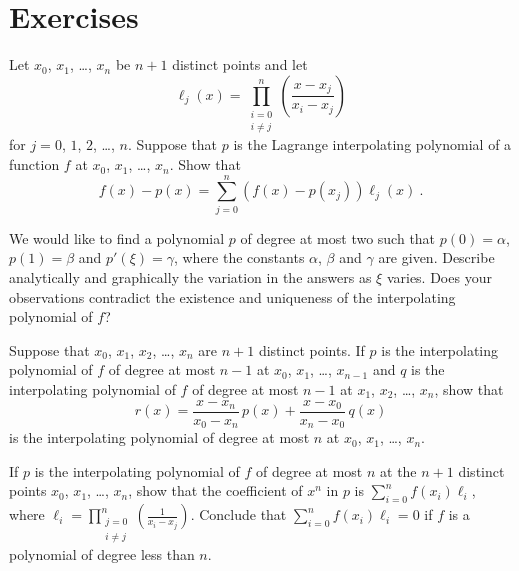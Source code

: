 \section{Exercises}

\begin{question}
Let $x_0$, $x_1$, \ldots, $x_n$ be $n+1$ distinct points and let
\[
\ell_j(x) = \prod_{\substack{i=0\\i\neq j}}^n \left(\frac{x-x_j}{x_i-x_j}\right)
\]
for $j=0$, $1$, $2$, \ldots, $n$.  Suppose that $p$ is the Lagrange
interpolating polynomial of a function $f$ at $x_0$, $x_1$, \ldots,
$x_n$.  Show that
\[
f(x) - p(x) = \sum_{j=0}^n \left(f(x)-p(x_j)\right) \ell_j(x) \ .
\]
\label{intAQ1}
\end{question}

\begin{question}
We would like to find a polynomial $p$ of degree at most two such that
$p(0) = \alpha$, $p(1) = \beta$ and $p'(\xi) = \gamma$, where the
constants $\alpha$, $\beta$ and $\gamma$ are given.  Describe
analytically and graphically the variation in the answers as $\xi$
varies.  Does your observations contradict the existence and uniqueness
of the interpolating polynomial of $f$?
\label{intAQ2}
\end{question}

\begin{question}
Suppose that $x_0$, $x_1$, $x_2$, \ldots, $x_n$ are $n+1$ distinct points.
If $p$ is the interpolating polynomial of $f$ of degree at most $n-1$
at $x_0$, $x_1$, \ldots, $x_{n-1}$ and $q$ is the interpolating
polynomial of $f$ of degree at most $n-1$ at $x_1$, $x_2$, \ldots,
$x_n$, show that
\[
r(x) = \frac{x-x_n}{x_0-x_n} \, p(x) + \frac{x-x_0}{x_n-x_0}\, q(x)
\]
is the interpolating polynomial of degree at most $n$ at $x_0$, $x_1$,
\ldots, $x_n$.
\label{intAQ3}
\end{question}

\begin{question}
If $p$ is the interpolating polynomial of $f$ of degree at most $n$ at
the $n+1$ distinct points $x_0$, $x_1$, \ldots, $x_n$, show that the
coefficient of $x^n$ in $p$ is
$\displaystyle \sum_{i=0}^n f(x_i) \ell_i$, where
$\displaystyle
\ell_i = \prod_{\substack{j=0\\i\neq j}}^n \left(\frac{1}{x_i-x_j} \right)$.
Conclude that $\displaystyle \sum_{i=0}^n f(x_i) \ell_i = 0$ if $f$
is a polynomial of degree less than $n$.
\label{intAQ4}
\end{question}

